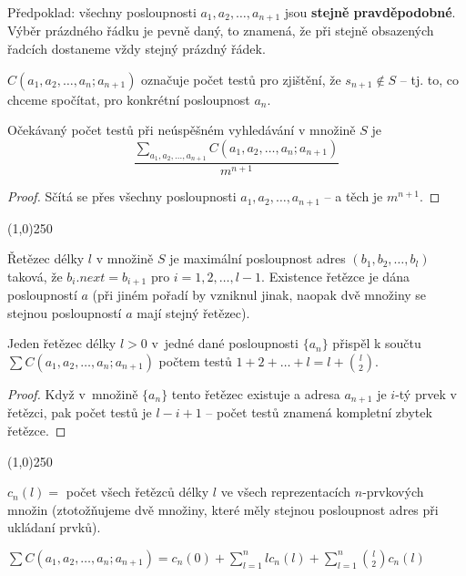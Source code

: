 \documentclass[a4paper,12pt]{article}
\newenvironment{myproof}{
  \begin{proof}
    
  }{
  \end{proof}
  \begin{center}
   \line(1,0){250}
   \end{center}
  }
\begin{document}
Předpoklad: všechny posloupnosti $a_1,a_2,\dots,a_{n+1}$ jsou 
{\bf stejně pravděpodobné}. Výběr prázdného řádku je 
pevně daný, to znamená, že při stejně obsazených 
řadcích dostaneme vždy stejný prázdný řádek.


\begin{definice} 
    $C(a_1,a_2,\dots,a_n;a_{n+1})$ označuje počet 
testů pro zjiš\-tění, že $s_{n+1}\notin S$ -- tj. to, co chceme spočítat, pro konkrétní posloupnost $a_n$.
\end{definice}

\begin{lemma}
    Očekávaný počet testů při 
    neúspěšném vy\-hledávání v množině $S$ je 
    $$\frac {\sum_{a_1,a_2,\dots
    ,a_{n+1}} C(a_1,a_2,\dots,a_n;a_{n+1})}{m^{n+1}}$$   
\end{lemma}

\begin{myproof}
    Sčítá se přes všechny posloupnosti $a_1,a_2,\dots
    ,a_{n+1}$ -- 
    a těch je $m^{n+1}$.
\end{myproof}

\begin{definice}
Řetězec délky $l$ v množině $S$ je maximální posloupnost 
adres $(b_1,b_2,\dots,b_l)$ taková, že $b_i.next=b_{i+1}$ pro 
$i=1,2,\dots,l-1$. Existence řetězce je dána posloupností $a$ (při jiném pořadí by vzniknul jinak, naopak dvě množiny se stejnou posloupností $a$ mají stejný řetězec).
\end{definice}

\begin{lemma}
    Jeden řetězec délky $l>0$ v~jedné dané posloupnosti $\{a_n\}$ přispěl k součtu 
    $\sum C(a_1,a_2,\dots,a_n;a_{n+1})$ počtem testů $1+2+\dots+l=l+\binom l2$.
\end{lemma}

\begin{myproof}
Když v~množině $\{a_n\}$ tento řetězec existuje a adresa $a_{n+1}$ je $i$-tý prvek v řetězci, pak počet 
testů je $l-i+1$ -- počet testů znamená  kompletní zbytek řetězce.
\end{myproof}


\begin{definice}
$c_n(l)=$ počet všech řetězců délky $
l$ ve všech 
reprezentacích $n$-prvkových množin (ztotožňuje\-me dvě 
množiny, které měly stej\-nou posloupnost adres při 
ukládaní prvků).
\end{definice}

\begin{lemma}
    $\sum C(a_1,a_2,\dots,a_n;a_{n+1})=c_n(0)+\sum_{l=1}^nlc_n(l)+\sum_{l=1}^n\binom l2c_n(l)$
\end{lemma}
\end{document}
